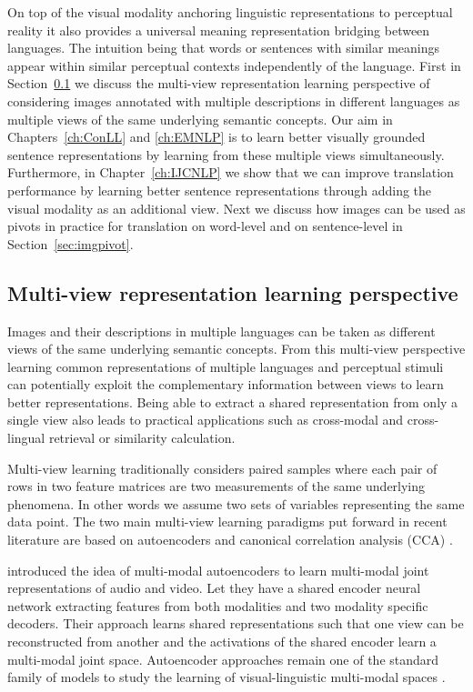 On top of the visual modality anchoring linguistic representations to perceptual reality it
also provides a universal meaning representation bridging between languages.
The  intuition being that words or sentences with similar meanings appear
within similar perceptual contexts independently of the language.
First in Section~\ref{sec:multiview} we discuss
the multi-view representation learning perspective of considering images annotated
with multiple descriptions in different languages as multiple views of the
same underlying semantic concepts.
Our aim in Chapters~\ref{ch:ConLL} and \ref{ch:EMNLP} is to learn
better visually grounded sentence representations by learning from these multiple views
simultaneously. Furthermore, in Chapter~\ref{ch:IJCNLP} we show that we can improve
translation performance by learning better sentence representations through  adding the visual
modality as an additional view.
Next we discuss how images can be used as pivots in practice for translation on word-level 
and on sentence-level in Section~\ref{sec:imgpivot}.

\subsection{Multi-view representation learning perspective}
\label{sec:multiview}


Images and their descriptions in multiple languages can be taken as different views of the
same underlying semantic concepts. From this multi-view perspective learning common representations
of multiple languages and perceptual stimuli can potentially exploit the complementary information
between views to learn better representations. Being able to extract
a shared representation from only a single view also leads to practical applications such as
cross-modal and cross-lingual retrieval or similarity calculation.

Multi-view learning traditionally considers paired samples
where each pair of rows in two feature matrices
are two measurements of the same
underlying phenomena. In other words we assume two sets of variables representing the
same data point. The two main multi-view learning paradigms put forward in recent literature are based on
autoencoders and canonical correlation analysis (CCA) \citep{wang2015deep}.

\cite{ngiam2011multimodal} introduced the idea
of multi-modal autoencoders to learn multi-modal joint representations of audio and video. Let
they have a shared encoder neural network extracting features from both modalities and two
modality specific decoders.  
Their approach learns shared representations such that one view can be reconstructed from another and
the activations of the shared encoder learn a multi-modal joint space.
Autoencoder approaches  remain one of the standard family of models
to study the learning of visual-linguistic multi-modal spaces \citep{silberer2014learning,silberer2017visually,wang2018associative}.

